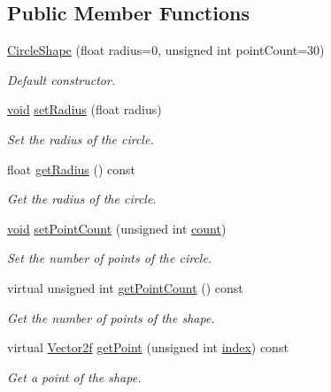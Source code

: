 \subsection*{Public Member Functions}
\begin{DoxyCompactItemize}
\item 
\hyperlink{classsf_1_1_circle_shape_a06a5e136da1cfa3bd2a945a5c7f718d3}{Circle\-Shape} (float radius=0, unsigned int point\-Count=30)
\begin{DoxyCompactList}\small\item\em Default constructor. \end{DoxyCompactList}\item 
\hyperlink{glutf90_8h_ac778d6f63f1aaf8ebda0ce6ac821b56e}{void} \hyperlink{classsf_1_1_circle_shape_a21cdf85fc2f201e10222a241af864be0}{set\-Radius} (float radius)
\begin{DoxyCompactList}\small\item\em Set the radius of the circle. \end{DoxyCompactList}\item 
float \hyperlink{classsf_1_1_circle_shape_afaf5175a75b6179cc177b1281027ab00}{get\-Radius} () const 
\begin{DoxyCompactList}\small\item\em Get the radius of the circle. \end{DoxyCompactList}\item 
\hyperlink{glutf90_8h_ac778d6f63f1aaf8ebda0ce6ac821b56e}{void} \hyperlink{classsf_1_1_circle_shape_a84249c4b23b20c24bf6891edde3cf744}{set\-Point\-Count} (unsigned int \hyperlink{gl3_8h_a5b40aca7a9682963dd00a8f5aef0a901}{count})
\begin{DoxyCompactList}\small\item\em Set the number of points of the circle. \end{DoxyCompactList}\item 
virtual unsigned int \hyperlink{classsf_1_1_circle_shape_ae41ed830ca8f459e88ea6f125c240949}{get\-Point\-Count} () const 
\begin{DoxyCompactList}\small\item\em Get the number of points of the shape. \end{DoxyCompactList}\item 
virtual \hyperlink{namespacesf_acf03098c2577b869e2fa6836cc48f1a0}{Vector2f} \hyperlink{classsf_1_1_circle_shape_a05139deaef220ed3d5a3bc4ca9aa9dbe}{get\-Point} (unsigned int \hyperlink{gl3_8h_a57f14e05b1900f16a2da82ade47d0c6d}{index}) const 
\begin{DoxyCompactList}\small\item\em Get a point of the shape. \end{DoxyCompactList}\end{DoxyCompactItemize}
